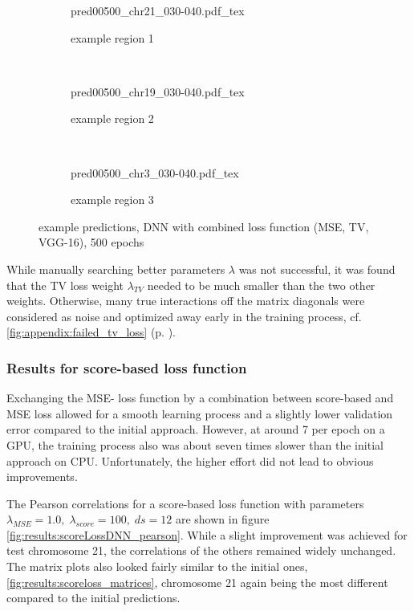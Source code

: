 \begin{figure}[p]
    \begin{subfigure}{\textwidth}
        \centering
        \scriptsize
        {pred00500_chr21_030-040.pdf_tex}
        \caption{example  region 1} \label{fig:results:combiloss_r1}
    \end{subfigure}\\[6mm]
    \begin{subfigure}{\textwidth}
        \centering
        \scriptsize
        {pred00500_chr19_030-040.pdf_tex}
        \caption{example region 2} \label{fig:results:combiloss_r2}
    \end{subfigure}\\[6mm]
    \begin{subfigure}{\textwidth}
        \centering
        \scriptsize
        {pred00500_chr3_030-040.pdf_tex}
        \caption{example region 3} \label{fig:results:combiloss_r3}
    \end{subfigure}
    \caption{example predictions, DNN with combined loss function (MSE, TV, VGG-16), 500 epochs} \label{fig:results:combiloss_matrices}
\end{figure}
While manually searching better parameters $\lambda$ was not successful,
it was found that the TV loss weight $\lambda_\mathit{TV}$ needed to be much smaller than the two other weights.
Otherwise, many true interactions off the matrix diagonals were considered as noise and optimized away early in the training process, cf.
\cref{fig:appendix:failed_tv_loss} (p. \pageref{fig:appendix:failed_tv_loss}).

\subsubsection{Results for score-based loss function} \label{sec:results:scorebased}
Exchanging the MSE- loss function by a combination between score-based and MSE loss
allowed for a smooth learning process and a slightly lower validation error compared to the initial approach.
However, at around \SI{7}{\min} per epoch on a GPU, the training process also was about seven times slower than the initial approach on CPU.
Unfortunately, the higher effort did not lead to obvious improvements.

The Pearson correlations for a score-based loss function with parameters $\lambda_\mathit{MSE}=1.0,\; \lambda_\mathit{score}=100,\; ds=12$ 
are shown in figure \ref{fig:results:scoreLossDNN_pearson}.
While a slight improvement was achieved for test chromosome 21, the correlations of the others remained widely unchanged.
The matrix plots also looked fairly similar to the initial ones, \cref{fig:results:scoreloss_matrices}, chromosome 21 again being the 
most different compared to the initial predictions.

